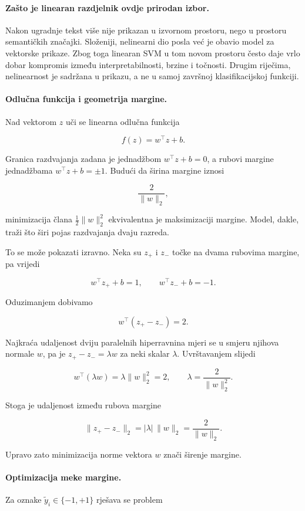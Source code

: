 \paragraph{Zašto je linearan razdjelnik ovdje prirodan izbor.}
Nakon ugradnje tekst više nije prikazan u izvornom prostoru, nego u prostoru semantičkih značajki. Složeniji, nelinearni dio posla već je obavio model za vektorske prikaze. Zbog toga linearan SVM u tom novom prostoru često daje vrlo dobar kompromis između interpretabilnosti, brzine i točnosti. Drugim riječima, nelinearnost je sadržana u prikazu, a ne u samoj završnoj klasifikacijskoj funkciji.

\paragraph{Odlučna funkcija i geometrija margine.}
Nad vektorom $z$ uči se linearna odlučna funkcija

\[
f(z)=w^\top z+b.
\]

Granica razdvajanja zadana je jednadžbom $w^\top z+b=0$, a rubovi margine jednadžbama $w^\top z+b=\pm 1$. Budući da širina margine iznosi

\[
\frac{2}{\|w\|_2},
\]

minimizacija člana $\frac{1}{2}\|w\|_2^2$ ekvivalentna je maksimizaciji margine. Model, dakle, traži što širi pojas razdvajanja dvaju razreda.

To se može pokazati izravno. Neka su $z_+$ i $z_-$ točke na dvama rubovima margine, pa vrijedi

\[
w^\top z_+ + b = 1,
\qquad
w^\top z_- + b = -1.
\]

Oduzimanjem dobivamo

\[
w^\top (z_+ - z_-) = 2.
\]

Najkraća udaljenost dviju paralelnih hiperravnina mjeri se u smjeru njihova normale $w$, pa je $z_+ - z_- = \lambda w$ za neki skalar $\lambda$. Uvrštavanjem slijedi

\[
w^\top(\lambda w)=\lambda\|w\|_2^2=2,
\qquad
\lambda=\frac{2}{\|w\|_2^2}.
\]

Stoga je udaljenost između rubova margine

\[
\|z_+-z_-\|_2 = |\lambda|\,\|w\|_2 = \frac{2}{\|w\|_2}.
\]

Upravo zato minimizacija norme vektora $w$ znači širenje margine.

\paragraph{Optimizacija meke margine.}
Za oznake $\tilde y_i\in\{-1,+1\}$ rješava se problem

